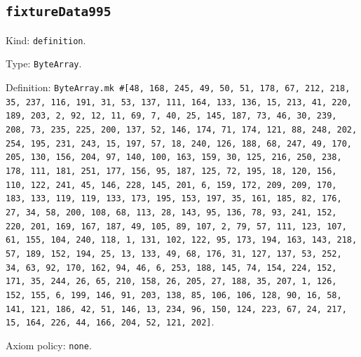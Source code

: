 \documentclass[11pt]{article}
\begin{document}
\subsection*{\texttt{fixtureData995}}
\noindent Kind: \texttt{definition}.\par
\noindent Type: \texttt{ByteArray}.\par
\noindent Definition: \texttt{ByteArray.mk \#[48, 168, 245, 49, 50, 51, 178, 67, 212, 218, 35, 237, 116, 191, 31, 53, 137, 111, 164, 133, 136, 15, 213, 41, 220, 189, 203, 2, 92, 12, 11, 69, 7, 40, 25, 145, 187, 73, 46, 30, 239, 208, 73, 235, 225, 200, 137, 52, 146, 174, 71, 174, 121, 88, 248, 202, 254, 195, 231, 243, 15, 197, 57, 18, 240, 126, 188, 68, 247, 49, 170, 205, 130, 156, 204, 97, 140, 100, 163, 159, 30, 125, 216, 250, 238, 178, 111, 181, 251, 177, 156, 95, 187, 125, 72, 195, 18, 120, 156, 110, 122, 241, 45, 146, 228, 145, 201, 6, 159, 172, 209, 209, 170, 183, 133, 119, 119, 133, 173, 195, 153, 197, 35, 161, 185, 82, 176, 27, 34, 58, 200, 108, 68, 113, 28, 143, 95, 136, 78, 93, 241, 152, 220, 201, 169, 167, 187, 49, 105, 89, 107, 2, 79, 57, 111, 123, 107, 61, 155, 104, 240, 118, 1, 131, 102, 122, 95, 173, 194, 163, 143, 218, 57, 189, 152, 194, 25, 13, 133, 49, 68, 176, 31, 127, 137, 53, 252, 34, 63, 92, 170, 162, 94, 46, 6, 253, 188, 145, 74, 154, 224, 152, 171, 35, 244, 26, 65, 210, 158, 26, 205, 27, 188, 35, 207, 1, 126, 152, 155, 6, 199, 146, 91, 203, 138, 85, 106, 106, 128, 90, 16, 58, 141, 121, 186, 42, 51, 146, 13, 234, 96, 150, 124, 223, 67, 24, 217, 15, 164, 226, 44, 166, 204, 52, 121, 202]}.\par
\noindent Axiom policy: \texttt{none}.\par
\end{document}
